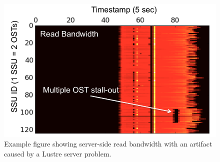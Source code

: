 \documentclass[conference,10pt,compsocconf]{IEEEtran}
\begin{document}
\begin{figure}[t]
\centering
\includegraphics[width=0.8\columnwidth]{figs/example.png}
\caption{Example figure showing server-side read bandwidth with an artifact
caused by a Lustre server problem.}
\label{fig:example}
\vspace{-.1in}
\end{figure}

%
% 
% 
\end{document}
